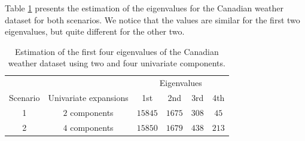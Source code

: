 \documentclass{article}
\newcounter{th}
\newcounter{scenario}[section]
\begin{document}
Table \ref{tab:eigenvalues} presents the estimation of the eigenvalues for the Canadian weather dataset for both scenarios. We notice that the values are similar for the first two eigenvalues, but quite different for the other two. 
\begin{table}
\centering
\begin{tabular}{c c | c c c c}
 & & \multicolumn{4}{c}{Eigenvalues} \\
Scenario & Univariate expansions & 1st & 2nd & 3rd & 4th \\
\hline
1 & $2$ components & $15845$ & $1675$ & $308$ & $45$ \\
2 & $4$ components & $15850$ & $1679$ & $438$ & $213$ \\
\hline
\end{tabular}
\caption{Estimation of the first four eigenvalues of the Canadian weather dataset using two and four univariate components.}
\label{tab:eigenvalues}
\end{table}
\end{document}
